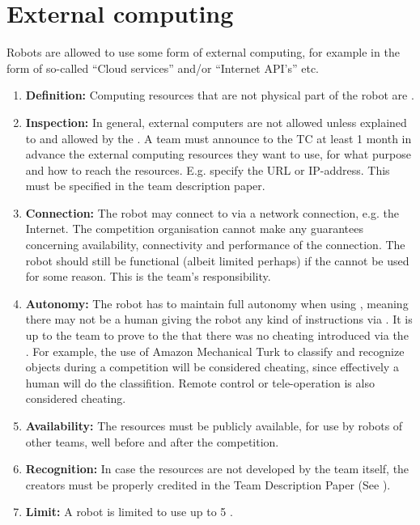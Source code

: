 \section{External computing}\label{rule:robot_external_computing}
Robots are allowed to use some form of external computing, for example in the form of so-called ``Cloud services'' and/or ``Internet API's'' etc. 
\begin{enumerate}
	\item \textbf{Definition:} Computing resources that are not physical part of the robot are . 
	\item \textbf{Inspection:} In general, external computers are not allowed unless explained to and allowed by the .
	  A team must announce to the TC at least 1 month in advance the external computing resources they want to use, for what purpose and how to reach the resources.
	  E.g. specify the URL or IP-address. 
	  This must be specified in the team description paper. 
	\item \textbf{Connection:} The robot may connect to  via a network connection, e.g. the Internet. 
	  The competition organisation cannot make any guarantees concerning availability, connectivity and performance of the connection. 
	  The robot should still be functional (albeit limited perhaps) if the  cannot be used for some reason.
	  This is the team's responsibility. 
	\item \textbf{Autonomy:} The robot has to maintain full autonomy when using , 
	  meaning there may not be a human giving the robot any kind of instructions via .
	  It is up to the team to prove to the  that there was no cheating introduced via the . 
	  For example, the use of Amazon Mechanical Turk to classify and recognize objects during a competition will be considered cheating, since effectively a human will do the classifition. 
	  Remote control or tele-operation is also considered cheating. 
	\item \textbf{Availability:} The resources must be publicly available, for use by robots of other teams, well before and after the competition.
	\item \textbf{Recognition:} In case the resources are not developed by the team itself, the creators must be properly credited in the Team Description Paper (See ).
	\item \textbf{Limit:} A robot is limited to use up to 5 . 
\end{enumerate}


 
